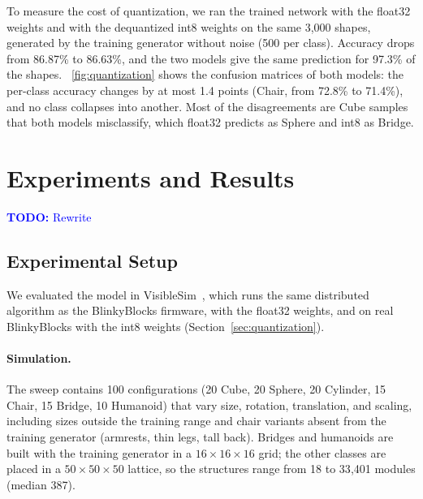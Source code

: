 \documentclass[12pt]{article}
\newcommand{\todo}[1]{\textcolor{blue}{\textbf{TODO:} #1}}
\begin{document}
To measure the cost of quantization, we ran the trained network with the float32 weights and with the dequantized int8 weights on the same 3{,}000 shapes, generated by the training generator without noise (500 per class). Accuracy drops from 86.87\% to 86.63\%, and the two models give the same prediction for 97.3\% of the shapes. \figurename~\ref{fig:quantization} shows the confusion matrices of both models: the per-class accuracy changes by at most 1.4 points (Chair, from 72.8\% to 71.4\%), and no class collapses into another. Most of the disagreements are Cube samples that both models misclassify, which float32 predicts as Sphere and int8 as Bridge.

\section{Experiments and Results}
\label{sec:experiments}

\todo{Rewrite}
\subsection{Experimental Setup}
\label{sec:setup}


We evaluated the model in VisibleSim~\cite{piranda2024ai4pm}, which runs the same distributed algorithm as the BlinkyBlocks firmware, with the float32 weights, and on real BlinkyBlocks with the int8 weights (Section~\ref{sec:quantization}).

\paragraph{Simulation.} The sweep contains 100 configurations (20 Cube, 20 Sphere, 20 Cylinder, 15 Chair, 15 Bridge, 10 Humanoid) that vary size, rotation, translation, and scaling, including sizes outside the training range and chair variants absent from the training generator (armrests, thin legs, tall back). Bridges and humanoids are built with the training generator in a $16\times16\times16$ grid; the other classes are placed in a $50\times50\times50$ lattice, so the structures range from 18 to 33{,}401 modules (median 387).
\end{document}
